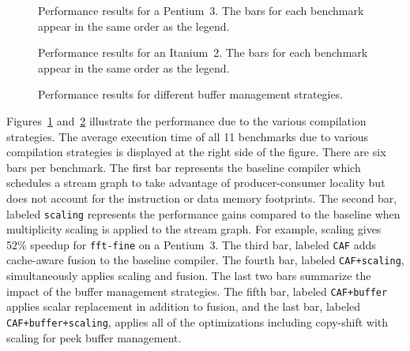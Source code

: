 

\begin{figure}[t]
  \vspace{-24pt}
  \hspace{-0.3in}
  \vspace{-48pt}
  \caption{Performance results for a Pentium~3.  The bars for each
  benchmark appear in the same order as the legend.}
  \label{fig:results-p3}
  \vspace{-3pt}
\end{figure}

\begin{figure}[t]
  \vspace{-36pt}
  \hspace{-0.3in}
  \vspace{-48pt}
  \caption{Performance results for an Itanium~2.  The bars for each
  benchmark appear in the same order as the legend.}
  \label{fig:results-ipf}
  \vspace{-12pt}
\end{figure}


\begin{figure}[t]
  \vspace{-74pt}
  \hspace{-0.3in}
  \vspace{-96pt}
  \caption{Performance results for different 
	   buffer management strategies.}
  \label{fig:results-peek}
  \vspace{-12pt}
\end{figure}


Figures~\ref{fig:results-p3} and~\ref{fig:results-ipf} illustrate the
performance due to the various compilation strategies. The average 
execution time of all 11 benchmarks due to various compilation strategies 
is displayed at the right side of the figure. There are six bars per 
benchmark. The first bar represents the baseline compiler which
schedules a stream graph to take advantage of producer-consumer
locality but does not account for the instruction or data memory
footprints. The second bar, labeled {\tt scaling} represents the
performance gains compared to the baseline when multiplicity scaling
is applied to the stream graph. For example, scaling gives 52\%
speedup for \texttt{fft-fine} on a Pentium~3. The third bar, 
labeled {\tt CAF} adds cache-aware fusion to the baseline compiler. The fourth
bar, labeled \texttt{CAF+scaling}, simultaneously applies scaling and
fusion. The last two bars summarize the impact of the buffer
management strategies. The fifth bar, labeled \texttt{CAF+buffer}
applies scalar replacement in addition to fusion, and the last bar,
labeled \texttt{CAF+buffer+scaling}, applies all of the optimizations
including copy-shift with scaling for peek buffer management.

